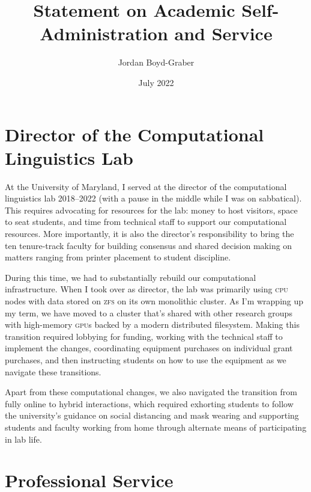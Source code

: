 \documentclass[11pt]{amsart}
\newcommand{\abr}[1]{\textsc{#1}}
\begin{document}
 \title{Statement on Academic Self-Administration and Service}

 \author{Jordan Boyd-Graber}
\address{University of Maryland}

\date{July 2022}


\keywords{}

\maketitle

\section{Director of the Computational Linguistics Lab}

At the University of Maryland, I served at the director of the
computational linguistics lab 2018--2022 (with a pause in the middle
while I was on sabbatical).
%
This requires advocating for resources for the lab: money to host
visitors, space to seat students, and time from technical staff to
support our computational resources.
%
More importantly, it is also the director's responsibility to bring
the ten tenure-track faculty for building consensus and shared
decision making on matters ranging from printer placement to student
discipline.

During this time, we had to substantially rebuild our computational
infrastructure.
%
When I took over as director, the lab was primarily using \abr{cpu}
nodes with data stored on \abr{zfs} on its own monolithic cluster.
%
As I'm wrapping up my term, we have moved to a cluster that's shared
with other research groups with high-memory \abr{gpu}s backed by a
modern distributed filesystem.
%
Making this transition required lobbying for funding, working with the
technical staff to implement the changes, coordinating equipment
purchases on individual grant purchases, and then instructing students
on how to use the equipment as we navigate these transitions.

Apart from these computational changes, we also navigated the
transition from fully online to hybrid interactions, which required
exhorting students to follow the university's guidance on social
distancing and mask wearing and supporting students and faculty
working from home through alternate means of participating in lab
life.

\section{Professional Service}
\end{document}

